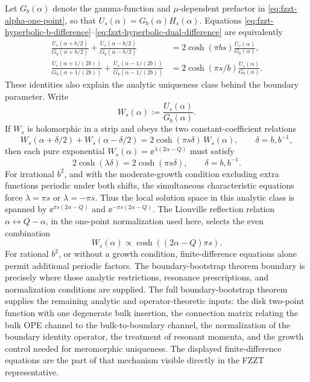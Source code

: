 Let \(G_b(\alpha)\) denote the gamma-function and \(\mu\)-dependent prefactor
in \eqref{eq:fzzt-alpha-one-point}, so that
\(U_s(\alpha)=G_b(\alpha)H_s(\alpha)\).  Equations
\eqref{eq:fzzt-hyperbolic-b-difference}--\eqref{eq:fzzt-hyperbolic-dual-difference}
are equivalently
\begin{align}
  \frac{U_s(\alpha+b/2)}{G_b(\alpha+b/2)}
  +
  \frac{U_s(\alpha-b/2)}{G_b(\alpha-b/2)}
  &=
  2\cosh(\pi b s)\frac{U_s(\alpha)}{G_b(\alpha)},
  \label{eq:fzzt-normalized-b-difference}\\
  \frac{U_s(\alpha+1/(2b))}{G_b(\alpha+1/(2b))}
  +
  \frac{U_s(\alpha-1/(2b))}{G_b(\alpha-1/(2b))}
  &=
  2\cosh(\pi s/b)\frac{U_s(\alpha)}{G_b(\alpha)}.
  \label{eq:fzzt-normalized-dual-difference}
\end{align}
These identities also explain the analytic uniqueness class behind the
boundary parameter.  Write
\[
  W_s(\alpha):=\frac{U_s(\alpha)}{G_b(\alpha)} .
\]
If \(W_s\) is holomorphic in a strip and obeys the two constant-coefficient
relations
\[
  W_s(\alpha+\delta/2)+W_s(\alpha-\delta/2)
  =
  2\cosh(\pi s\delta)\,W_s(\alpha),
  \qquad \delta=b,b^{-1},
\]
then each pure exponential \(W_s(\alpha)=\ee^{\lambda(2\alpha-Q)}\) must
satisfy
\[
  2\cosh(\lambda\delta)=2\cosh(\pi s\delta),
  \qquad \delta=b,b^{-1}.
\]
For irrational \(b^2\), and with the moderate-growth condition excluding
extra functions periodic under both shifts, the simultaneous characteristic
equations force \(\lambda=\pi s\) or \(\lambda=-\pi s\).  Thus the local
solution space in this analytic class is spanned by
\(\ee^{\pi s(2\alpha-Q)}\) and \(\ee^{-\pi s(2\alpha-Q)}\).  The Liouville
reflection relation \(\alpha\leftrightarrow Q-\alpha\), in the one-point
normalization used here, selects the even combination
\[
  W_s(\alpha)\propto
  \cosh\!\left((2\alpha-Q)\pi s\right).
\]
For rational \(b^2\), or without a growth condition, finite-difference
equations alone permit additional periodic factors.  The boundary-bootstrap
theorem boundary is precisely where those analytic restrictions, resonance
prescriptions, and normalization conditions are supplied.
The full boundary-bootstrap theorem supplies the remaining analytic and
operator-theoretic inputs: the disk two-point function with one degenerate
bulk insertion, the connection matrix relating the bulk OPE channel to the
bulk-to-boundary channel, the normalization of the boundary identity
operator, the treatment of resonant momenta, and the growth control needed
for meromorphic uniqueness.  The displayed finite-difference equations are
the part of that mechanism visible directly in the FZZT representative.

